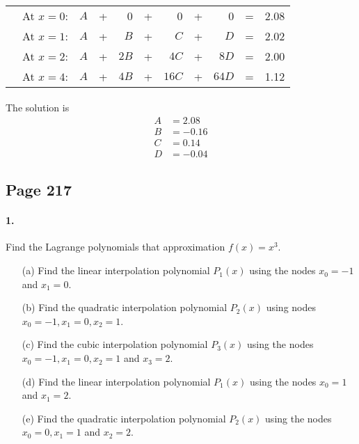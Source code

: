 \documentclass{article}  %
\begin{document}
        \paragraph{}
        \renewcommand\tabcolsep{6.0pt} %
            \begin{threeparttable} %
                \begin{tabular}{rrrrrrrrrrr} 
                & At $x = 0$: & $A$ & + & 0 & + & 0 & + & 0 & = & 2.08 \\ 
                & At $x = 1$: & $A$ & + & $B$ & + & $C$ & + & $D$ & = & 2.02 \\ 
                & At $x = 2$: & $A$ & + & $2B$ & + & $4C$ & + & $8D$ & = & 2.00 \\ 
                & At $x = 4$: & $A$ & + & $4B$ & + & $16C$ & + & $64D$ & = & 1.12 \\ 
                \end{tabular} 
            \end{threeparttable}
        \paragraph{}The solution is 
        \begin{align*}
            A &=  2.08  \\
            B &=  -0.16  \\
            C &=  0.14  \\
            D &=  -0.04 
        \end{align*}
        \subsection*{Page 217}
        \paragraph{1.}Find the Lagrange polynomials that approximation $f(x) = x^3$.
        \begin{enumerate}
            \item[(a)] 
            Find the linear interpolation polynomial $P_1(x)$ using the nodes $x_0 = -1$ and $x_1 = 0$.
            \item[(b)]
            Find the quadratic interpolation polynomial $P_2(x)$ using nodes $x_0 = -1, x_1 = 0, x_2 = 1$.
            \item[(c)]
            Find the cubic interpolation polynomial $P_3(x)$ using the nodes $x_0 = -1, x_ 1 = 0, x_2 = 1$ and $x_3 = 2$.
            \item[(d)]
            Find the linear interpolation polynomial $P_1(x)$ using the nodes $x_0 = 1$ and $x_1 = 2$.
            \item[(e)]
            Find the quadratic interpolation polynomial $P_2(x)$ using the nodes $x_0 = 0, x_1 = 1$ and $x_2 = 2$.
        \end{enumerate}
\end{document}
